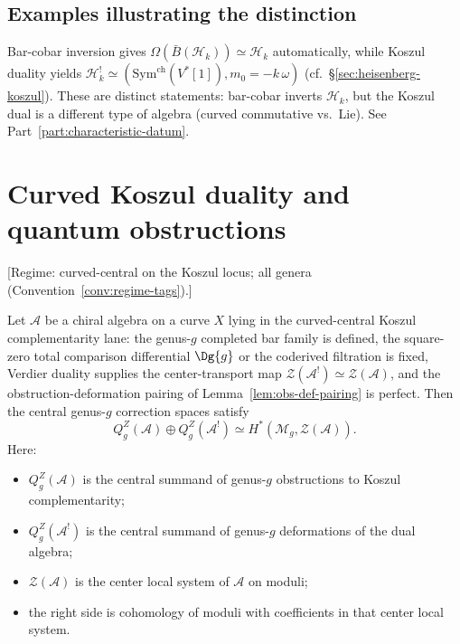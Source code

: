 \subsection{Examples illustrating the distinction}

\begin{example}\label{ex:heisenberg-koszul-vs-barcobar}
Bar-cobar inversion gives $\Omega(\bar{B}(\mathcal{H}_k)) \simeq
\mathcal{H}_k$ automatically, while Koszul duality yields
$\mathcal{H}_k^!\simeq
(\mathrm{Sym}^{\mathrm{ch}}(V^*[1]),m_0=-k\,\omega)$
(cf.\ \S\ref{sec:heisenberg-koszul}). These are distinct statements:
bar-cobar inverts $\mathcal{H}_k$, but the Koszul dual is a different
type of algebra (curved commutative vs.\ Lie). See
Part~\ref{part:characteristic-datum}.
\end{example}

\section{Curved Koszul duality and quantum obstructions}
\label{sec:curved-koszul-quantum}

\begin{theorem}\label{thm:deformation-obstruction}
\textup{[Regime: curved-central on the Koszul locus; all genera
\textup{(}Convention~\textup{\ref{conv:regime-tags})}.]}

Let $\mathcal{A}$ be a chiral algebra on a curve $X$ lying in the
curved-central Koszul complementarity lane: the genus-$g$ completed bar
family is defined, the square-zero total comparison differential
$\Dg{g}$ or the coderived filtration is fixed, Verdier duality supplies
the center-transport map
$\mathcal Z(\mathcal A^!)\simeq\mathcal Z(\mathcal A)$, and the
obstruction-deformation pairing of Lemma~\ref{lem:obs-def-pairing} is
perfect. Then the central genus-$g$ correction spaces satisfy
\[
Q_g^Z(\mathcal{A}) \oplus Q_g^Z(\mathcal{A}^!)
\simeq
H^*(\mathcal{M}_g, \mathcal Z(\mathcal{A})).
\]
Here:
\begin{itemize}
\item $Q_g^Z(\mathcal{A})$ is the central summand of genus-$g$
 obstructions to Koszul complementarity;
\item $Q_g^Z(\mathcal{A}^!)$ is the central summand of genus-$g$
 deformations of the dual algebra;
\item $\mathcal Z(\mathcal{A})$ is the center local system of
 $\mathcal{A}$ on moduli;
\item the right side is cohomology of moduli with coefficients in that
 center local system.
\end{itemize}
\end{theorem}

